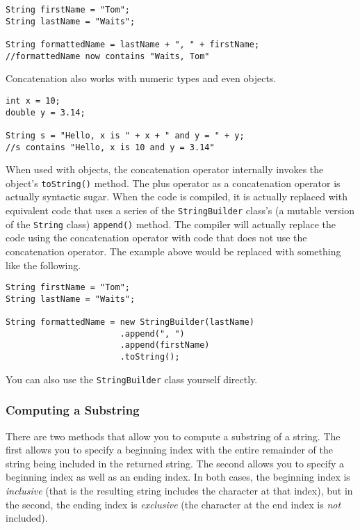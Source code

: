 \begin{verbatim}
String firstName = "Tom";
String lastName = "Waits";

String formattedName = lastName + ", " + firstName;
//formattedName now contains "Waits, Tom"
\end{verbatim}

Concatenation also works with numeric types and even
objects.

\begin{verbatim}
int x = 10;
double y = 3.14;

String s = "Hello, x is " + x + " and y = " + y;
//s contains "Hello, x is 10 and y = 3.14"
\end{verbatim}

When used with objects, the concatenation operator 
internally invokes the object's \texttt{toString()}
method.  The plus operator as a concatenation operator 
is actually \gls{syntactic sugar}.  When the code is compiled, 
it is actually replaced with equivalent code that uses 
a series of the \texttt{StringBuilder} class's 
(a mutable version of the \texttt{String} class) 
\texttt{append()} method.  The compiler will actually
replace the code using the concatenation operator with
code that does not
use the concatenation operator.  The example above would
be replaced with something like the following.

\begin{verbatim}
String firstName = "Tom";
String lastName = "Waits";

String formattedName = new StringBuilder(lastName)
                       .append(", ")
                       .append(firstName)
                       .toString();
\end{verbatim}

You can also use the \texttt{StringBuilder} class
yourself directly.

\subsubsection{Computing a Substring}

There are two methods that allow you to compute
a substring of a string.  The first allows you to
specify a beginning index with the entire remainder
of the string being included in the returned string.
The second allows you to specify a beginning index
as well as an ending index.  In both cases, the
beginning index is \emph{inclusive} (that is the resulting
string includes the character at that index), but
in the second, the ending index is \emph{exclusive}
(the character at the end index is \emph{not} included).


